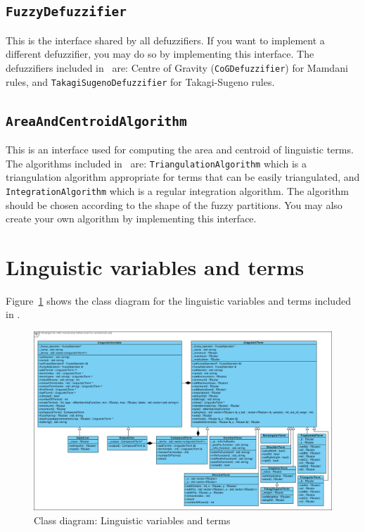 	\subsection{\texttt{FuzzyDefuzzifier}}
		This is the interface shared by all defuzzifiers. If you want to implement a different defuzzifier, you may do so by implementing this interface. The defuzzifiers included in \fl\ are: Centre of Gravity (\texttt{CoGDefuzzifier}) for Mamdani rules, and \texttt{TakagiSugenoDefuzzifier} for Takagi-Sugeno rules.
		
	\subsection{\texttt{AreaAndCentroidAlgorithm}}
		This is an interface used for computing the area and centroid of linguistic terms. The algorithms included in \fl\ are: \texttt{TriangulationAlgorithm} which is a triangulation algorithm appropriate for terms that can be easily triangulated, and \texttt{IntegrationAlgorithm} which is a regular integration algorithm. The algorithm should be chosen according to the shape of the fuzzy partitions. You may also create your own algorithm by implementing this interface.
		
		
	\section{Linguistic variables and terms}
		Figure~\ref{f:linguistics} shows the class diagram for the linguistic variables and terms included in \fl. 
		
		\begin{landscape}
			

		\begin{figure}[ht]
			\centering
			\includegraphics[scale=0.55]{./figures/fuzzy-linguistic.png}
			\caption{Class diagram: Linguistic variables and terms}
			\label{f:linguistics}
		\end{figure}
		\end{landscape}		
